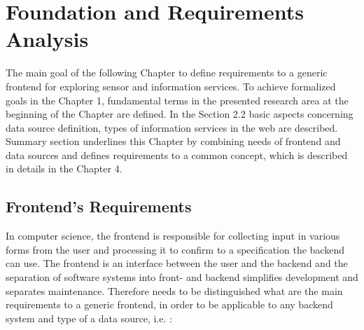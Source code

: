 \chapter{Foundation and Requirements Analysis}
	The main goal of the following Chapter to define requirements to a generic frontend for exploring sensor and information services. To achieve formalized goals in the Chapter 1, fundamental terms in the presented research area at the beginning of the Chapter are defined. In the Section 2.2 basic aspects concerning data source definition, types of information services in the web are described. Summary section underlines this Chapter by combining needs of frontend and data sources and defines requirements to a common concept, which is described in details in the Chapter 4.

\section {Frontend's Requirements}
	In computer science, the frontend is responsible for collecting input in various forms from the user and processing it to confirm to a specification the backend can use. The frontend is an interface between the user and the backend\cite{wiki:xxx} and the separation of software systems into front- and backend simplifies development and separates maintenance. Therefore needs to be distinguished what are the main requirements to a generic frontend, in order to be applicable to any backend system and type of a data source, i.e. :

